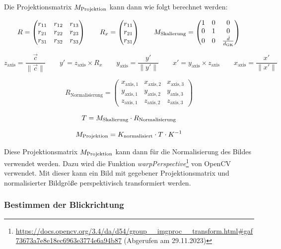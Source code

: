 Die Projektionsmatrix $M_\text{Projektion}$ kann dann wie folgt berechnet werden:

\[
R = \begin{pmatrix}
    r_{11} & r_{12} & r_{13} \\
    r_{21} & r_{22} & r_{23} \\
    r_{31} & r_{32} & r_{33}
\end{pmatrix} \qquad R_x = \begin{pmatrix}
r_{11} \\
r_{21} \\
r_{31} 
\end{pmatrix} \qquad M_\text{Skalierung} = \begin{pmatrix}
    1 & 0 & 0 \\
    0 & 1 & 0 \\
    0 & 0 & \frac{\hat{d}}{d_{\text{GK}}}
\end{pmatrix}
\]

\[
z_{\text{axis}} = \frac{\vec{c}}{\|\vec{c}\|} \qquad
y' = z_{\text{axis}} \times R_x \qquad
y_{\text{axis}} = \frac{y'}{\|y'\|} \qquad
x' = y_{\text{axis}} \times z_{\text{axis}} \qquad
x_{\text{axis}} = \frac{x'}{\|x'\|}
\]

\[
R_{\text{Normalisierung}} = \begin{pmatrix}
    x_{\text{axis},1} & x_{\text{axis},2} & x_{\text{axis},3} \\
    y_{\text{axis},1} & y_{\text{axis},2} & y_{\text{axis},3} \\
    z_{\text{axis},1} & z_{\text{axis},2} & z_{\text{axis},3}
\end{pmatrix}
\]

\[
T = M_\text{Skalierung} \cdot R_{\text{Normalisierung}}
\]

\[
M_\text{Projektion} = K_{\text{normalisiert}} \cdot T \cdot K^{-1}
\]

Diese Projektionsmatrix $M_\text{Projektion}$ kann dann für die Normalisierung des Bildes verwendet werden. Dazu wird die Funktion \textit{warpPerspective}\footnote{\url{https://docs.opencv.org/3.4/da/d54/group__imgproc__transform.html#gaf73673a7e8e18ec6963e3774e6a94b87} (Abgerufen am 29.11.2023)} von OpenCV verwendet. Mit dieser kann ein Bild mit gegebener Projektionsmatrix und normalisierter Bildgröße perspektivisch transformiert werden.

\subsubsection{Bestimmen der Blickrichtung}

